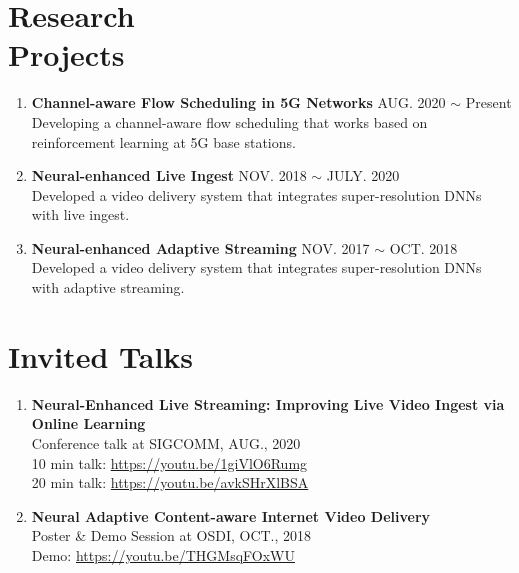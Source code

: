 \documentclass[margin,line,letter]{cv}
\def \pubitem {\vspace{0.08in}\item}
\begin{document}
\begin{resume}
\section{\sc Research \\ Projects \\}
\begin{enumerate}
	\pubitem{\textbf{Channel-aware Flow Scheduling in 5G Networks} \hfill \textsc{AUG.} 2020 $\sim$ Present \\ Developing a channel-aware flow scheduling that works based on reinforcement learning at 5G base stations.}
	\pubitem{\textbf{Neural-enhanced Live Ingest} \hfill \textsc{NOV.} 2018 $\sim$ \textsc{JULY.} 2020 \\ Developed a video delivery system that integrates super-resolution DNNs with live ingest.}
	\pubitem{\textbf{Neural-enhanced Adaptive Streaming} \hfill \textsc{NOV.} 2017 $\sim$ \textsc{OCT.} 2018 \\ Developed a video delivery system that integrates super-resolution DNNs with adaptive streaming.}
\end{enumerate}

\vspace{0.5cm}

\section{\sc Invited Talks \\}
\begin{enumerate}
	\pubitem{\textbf{Neural-Enhanced Live Streaming: Improving Live Video Ingest via Online Learning} \\ Conference talk at SIGCOMM, AUG., 2020 \\10 min talk: \url{https://youtu.be/1giVlO6Rumg} \\ 20 min talk: \url{https://youtu.be/avkSHrXlBSA} }
	\pubitem{\textbf{Neural Adaptive Content-aware Internet Video Delivery} \\ Poster \& Demo Session at OSDI, OCT., 2018 \\ Demo: \url{https://youtu.be/THGMsqFOxWU} }
\end{enumerate}




\end{resume}
\end{document}
